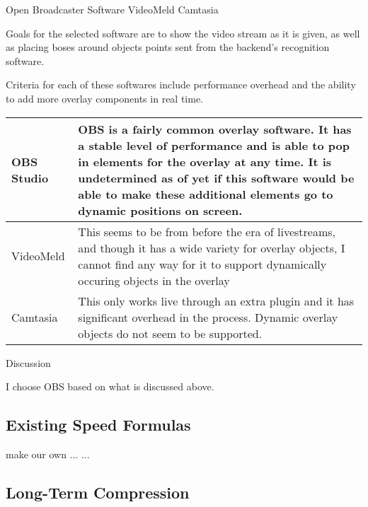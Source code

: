 \documentclass[letterpaper,10pt,onecolumn,draftclsnofoot]{IEEEtran}
\begin{document}
Open Broadcaster Software
VideoMeld
Camtasia

Goals for the selected software are to show the video stream as it is given, as well as placing boses around objects points sent from the backend's recognition software.

Criteria for each of these softwares include performance overhead and the ability to add more overlay components in real time.

\begin{tabular}{ l l }
  OBS Studio & OBS is a fairly common overlay software.  It has a stable level of performance and is able to pop in elements for the overlay at any time.  It is undetermined as of yet if this software would be able to make these additional elements go to dynamic positions on screen. \\ \hline
  VideoMeld & This seems to be from before the era of livestreams, and though it has a wide variety for overlay objects, I cannot find any way for it to support dynamically occuring objects in the overlay  \\ \hline
  Camtasia & This only works live through an extra plugin and it has significant overhead in the process.  Dynamic overlay objects do not seem to be supported. \\
\end{tabular}

Discussion

I choose OBS based on what is discussed above.

\newpage
\subsection{Existing Speed Formulas} %

make our own
...
...

\newpage
\subsection{Long-Term Compression} %
\end{document}
